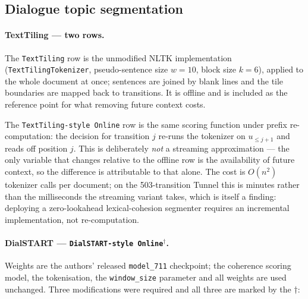 \subsection{Dialogue topic segmentation}
\label{app:baselines-dts}

\paragraph{TextTiling \citep{hearst1997text} --- two rows.}
The \texttt{TextTiling} row is the unmodified NLTK implementation
(\texttt{TextTilingTokenizer}, pseudo-sentence size $w=10$, block size $k=6$),
applied to the whole document at once; sentences are joined by blank lines and
the tile boundaries are mapped back to transitions. It is offline and is
included as the reference point for what removing future context costs.

The \texttt{TextTiling-style Online} row is the same scoring function under
prefix re-computation: the decision for transition $j$ re-runs the tokenizer on
$u_{\le j+1}$ and reads off position $j$. This is deliberately \emph{not} a
streaming approximation --- the only variable that changes relative to the
offline row is the availability of future context, so the difference is
attributable to that alone. The cost is $O(n^2)$ tokenizer calls per document;
on the 503-transition Tunnel this is minutes rather than the milliseconds the
streaming variant takes, which is itself a finding: deploying a zero-lookahead
lexical-cohesion segmenter requires an incremental implementation, not
re-computation.

\paragraph{DialSTART \citep{gao2023unsupervised} ---
\texttt{DialSTART-style Online}$^{\dagger}$.}
Weights are the authors' released \texttt{model\_711} checkpoint; the coherence
scoring model, the tokenisation, the \texttt{window\_size} parameter and all
weights are used unchanged. Three modifications were required and all three are
marked by the $\dagger$:


